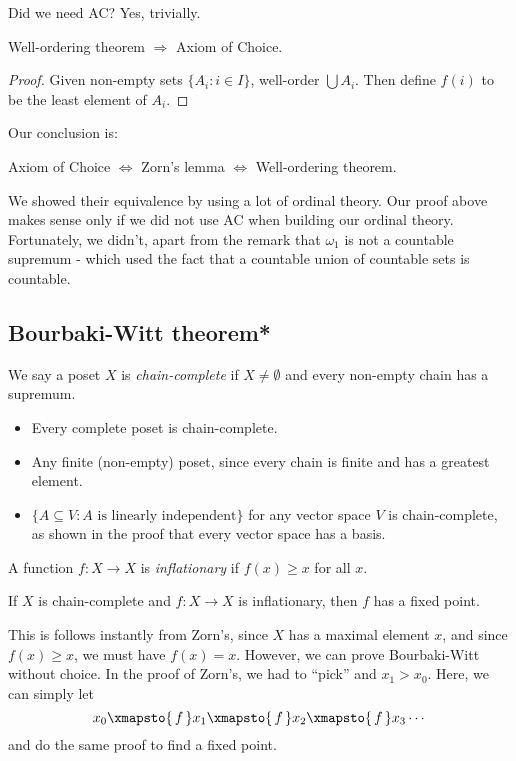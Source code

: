 \documentclass[a4paper]{article}
\begin{document}
Did we need AC? Yes, trivially.
\begin{thm}
  Well-ordering theorem $\Rightarrow $ Axiom of Choice.
\end{thm}

\begin{proof}
  Given non-empty sets $\{A_i: i\in I\}$, well-order $\bigcup A_i$. Then define $f(i)$ to be the least element of $A_i$.
\end{proof}
Our conclusion is:
\begin{center}
  Axiom of Choice $\Leftrightarrow$ Zorn's lemma $\Leftrightarrow$ Well-ordering theorem.
\end{center}
\note We showed their equivalence by using a lot of ordinal theory. Our proof above makes sense only if we did not use AC when building our ordinal theory. Fortunately, we didn't, apart from the remark that $\omega_1$ is not a countable supremum - which used the fact that a countable union of countable sets is countable.

\subsection{Bourbaki-Witt theorem*}
\begin{defi}
  We say a poset $X$ is \emph{chain-complete} if $X \not=\emptyset$ and every non-empty chain has a supremum.
\end{defi}

\begin{eg}\leavevmode
  \begin{itemize}
    \item Every complete poset is chain-complete.
    \item Any finite (non-empty) poset, since every chain is finite and has a greatest element.
    \item $\{A\subseteq V:  A\text{ is linearly independent}\}$ for any vector space $V$ is chain-complete, as shown in the proof that every vector space has a basis.
  \end{itemize}
\end{eg}

\begin{defi}
  A function $f: X\to X$ is \emph{inflationary} if $f(x) \geq x$ for all $x$.
\end{defi}

\begin{thm}
  If $X$ is chain-complete and $f: X\to X$ is inflationary, then $f$ has a fixed point.
\end{thm}
This is follows instantly from Zorn's, since $X$ has a maximal element $x$, and since $f(x) \geq x$, we must have $f(x) = x$. However, we can prove Bourbaki-Witt without choice. In the proof of Zorn's, we had to ``pick'' and $x_1 > x_0$. Here, we can simply let
\[
  x_0 \xmapsto{\,f\,} x_1 \xmapsto{\,f\,} x_2 \xmapsto{\,f\,} x_3 \cdots
\]
and do the same proof to find a fixed point.
\end{document}
